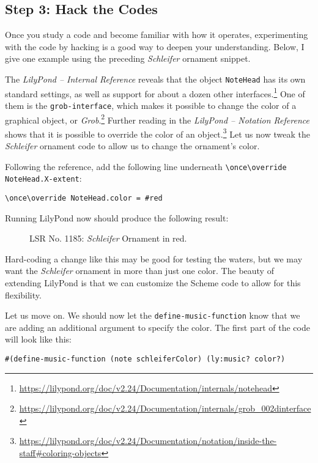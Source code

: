 \subsection {Step 3: Hack the Codes}

Once you study a code and become familiar with how it operates, experimenting with the code by hacking is a good way to deepen your understanding. Below, I give one example using the preceding \textit{Schleifer} ornament snippet.

The \textit{LilyPond -- Internal Reference} reveals that the object \verb+NoteHead+ has its own standard settings, as well as support for about a dozen other interfaces.\footnote{\url{https://lilypond.org/doc/v2.24/Documentation/internals/notehead}} One of them is the \verb+grob-interface+, which makes it possible to change the color of a graphical object, or \textit{Grob}.\footnote{\url{https://lilypond.org/doc/v2.24/Documentation/internals/grob_002dinterface}} Further reading in the \textit{LilyPond -- Notation Reference} shows that it is possible to override the color of an object.\footnote{\url{https://lilypond.org/doc/v2.24/Documentation/notation/inside-the-staff#coloring-objects}} Let us now tweak the \textit{Schleifer} ornament code to allow us to change the ornament's color.

Following the reference, add the following line underneath \verb+\once\override NoteHead.X-extent+:

\begin{verbatim}
\once\override NoteHead.color = #red
\end{verbatim}

Running LilyPond now should produce the following result:
	\begin{figure}[!htb]
	\centering
{}
	\caption{\label{fig:figure2} LSR No. 1185: \textit{Schleifer} Ornament in red.}
	\end{figure}
Hard-coding a change like this may be good for testing the waters, but we may want the \textit{Schleifer} ornament in more than just one color. The beauty of extending LilyPond is that we can customize the Scheme code to allow for this flexibility.

Let us move on. We should now let the \verb+define-music-function+ know that we are adding an additional argument to specify the color. The first part of the code will look like this:

\begin{verbatim}
#(define-music-function (note schleiferColor) (ly:music? color?) 
\end{verbatim}


